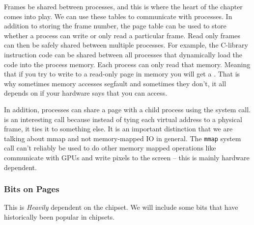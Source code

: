 Frames be shared between processes, and this is where the heart of the chapter comes into play.
We can use these tables to communicate with processes.
In addition to storing the frame number, the page table can be used to store whether a process can write or only read a particular frame.
Read only frames can then be safely shared between multiple processes.
For example, the C-library instruction code can be shared between all processes that dynamically load the code into the process memory.
Each process can only read that memory.
Meaning that if you try to write to a read-only page in memory you will get a .
That is why sometimes memory accesses segfault and sometimes they don't, it all depends on if your hardware says that you can access.

In addition, processes can share a page with a child process using the  system call.
 is an interesting call because instead of tying each virtual address to a physical frame, it ties it to something else. It is an important distinction that we are talking about mmap and not memory-mapped IO in general. The \texttt{mmap} system call can't reliably be used to do other memory mapped operations like communicate with GPUs and write pixels to the screen -- this is mainly hardware dependent.

\subsubsection{Bits on Pages}

This is \textit{Heavily} dependent on the chipset.
We will include some bits that have historically been popular in chipsets.

